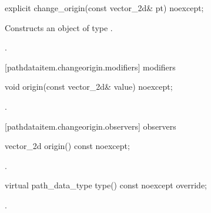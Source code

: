 \begin{itemdecl}
    explicit change_origin(const vector_2d& pt) noexcept;
\end{itemdecl}
\begin{itemdescr}
	\pnum
	\effects
	Constructs an object of type .
	
	\pnum
	\postconditions
	.
\end{itemdescr}

 [pathdataitem.changeorigin.modifiers]{ modifiers}

\begin{itemdecl}
    void origin(const vector_2d& value) noexcept;
\end{itemdecl}
\begin{itemdescr}
	\pnum
	\postconditions
	.
\end{itemdescr}

 [pathdataitem.changeorigin.observers]{ observers}

\begin{itemdecl}
    vector_2d origin() const noexcept;
\end{itemdecl}
\begin{itemdescr}
	\pnum
	\returns
	.
\end{itemdescr}

\begin{itemdecl}
    virtual path_data_type type() const noexcept override;
\end{itemdecl}
\begin{itemdescr}
	\pnum
	\returns
	.
\end{itemdescr}
